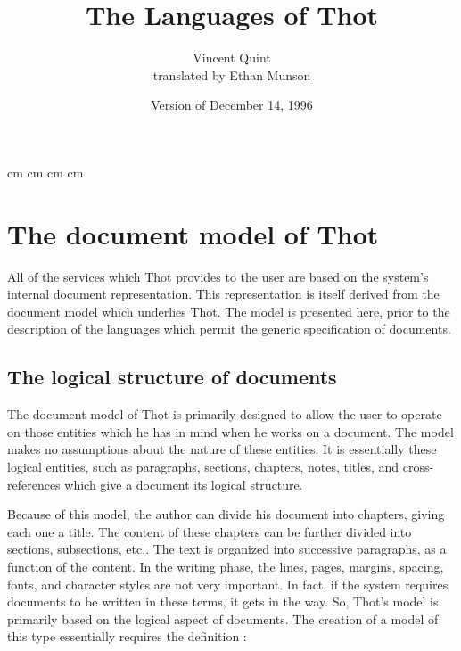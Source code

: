 
\marginparwidth 0pt
 cm
 cm
\marginparsep 0pt
\topmargin   0pt
 cm
 cm

\newcommand{\ignore}[1]{}
\newenvironment{example}{\begin{quotation}\noindent{\bf Example~:}}{\end{quotation}}

\title{\Huge The Languages of Thot}
\author{Vincent Quint\\
translated by Ethan Munson}
\date{Version of December 14, 1996}
\maketitle

\setcounter{page}{1}
\tableofcontents
\cleardoublepage

\setcounter{page}{1}
\chapter{The document model of Thot}

All of the services which Thot provides to the user are based on the
system's internal document representation.  This representation is
itself derived from the document model which underlies Thot.  The
model is presented here, prior to the description of the languages
which permit the generic specification of documents.

\section{The logical structure of documents}

The document model of Thot is primarily designed to allow the user to
operate on those entities which he has in mind when he works on a
document.  The model makes no assumptions about the nature of these entities.
It is essentially these logical entities, such as paragraphs, sections,
chapters, notes, titles, and cross-references which give a document
its logical structure.

Because of this model, the author can divide his document into
chapters, giving each one a title.  The content of these chapters can
be further divided into sections, subsections, etc..  The text is
organized into successive paragraphs, as a function of the content.
In the writing phase, the lines, pages, margins, spacing, fonts,
and character styles are not very important.  In fact, if the system
requires documents to be written in these terms, it gets in the way.
So, Thot's model is primarily based on the logical aspect of
documents.  The creation of a model of this type essentially requires
the definition :

